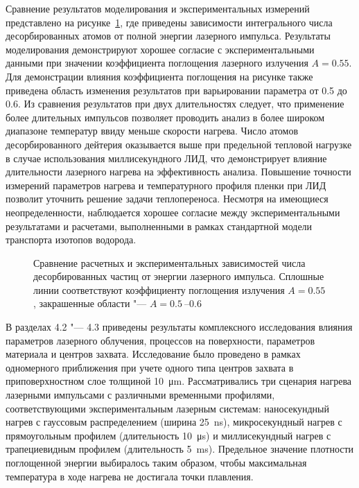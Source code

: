 Сравнение результатов моделирования и экспериментальных измерений представлено на рисунке~\cref{fig:LID_Comparison}, где приведены зависимости интегрального числа десорбированных атомов от полной энергии лазерного импульса. Результаты моделирования демонстрируют хорошее согласие с экспериментальными данными при значении коэффициента поглощения лазерного излучения \(A=\num{0.55}\). Для демонстрации влияния коэффициента поглощения на рисунке также приведена область изменения результатов при варьировании параметра от \num{0.5} до \num{0.6}. Из сравнения результатов при двух длительностях следует, что применение более длительных импульсов позволяет проводить анализ в более широком диапазоне температур ввиду меньше скорости нагрева. Число атомов десорбированного дейтерия оказывается выше при предельной тепловой нагрузке в случае использования миллисекундного ЛИД, что демонстрирует влияние длительности лазерного нагрева на эффективность анализа. Повышение точности измерений параметров нагрева и температурного профиля пленки при ЛИД позволит уточнить решение задачи теплопереноса. Несмотря на имеющиеся неопределенности, наблюдается хорошее согласие между экспериментальными результатами и расчетами, выполненными в рамках стандартной модели транспорта изотопов водорода.

\begin{figure}[ht]
    \caption{Сравнение расчетных и экспериментальных зависимостей числа десорбированных частиц от энергии лазерного импульса. Сплошные линии соответствуют коэффициенту поглощения излучения \( A=\num{0.55} \), закрашенные области "--- \( A = \SIrange{0.5}{0.6}{} \)}\label{fig:LID_Comparison}
\end{figure}

В разделах 4.2 "--- 4.3 приведены результаты комплексного исследования влияния параметров лазерного облучения, процессов на поверхности, параметров материала и центров захвата. Исследование было проведено в рамках одномерного приближения при учете одного типа центров захвата в приповерхностном слое толщиной \SI{10}{\micro\meter}. Рассматривались три сценария нагрева лазерными импульсами с различными временными профилями, соответствующими экспериментальным лазерным системам: наносекундный нагрев с гауссовым распределением (ширина \SI{25}{\nano\second}), микросекундный нагрев с прямоугольным профилем (длительность \SI{10}{\micro\second}) и миллисекундный нагрев с трапециевидным профилем (длительность \SI{5}{\milli\second}). Предельное значение плотности поглощенной энергии выбиралось таким образом, чтобы максимальная температура в ходе нагрева не достигала точки плавления.

